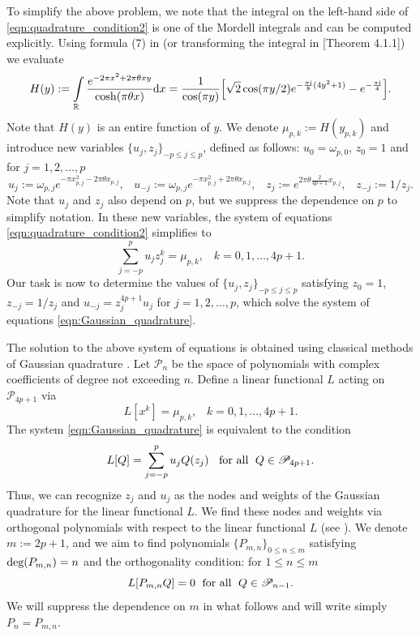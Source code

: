 \documentclass[12pt]{article}
\def\r{{\mathbb R}}
\def\d{{\textnormal d}}
\def\i{{\textnormal i}}
\theoremstyle{definition}
\begin{document}
To simplify the above problem, we note that the integral on the left-hand side of \eqref{eqn:quadrature_condition2} is one of the Mordell integrals \cite{Mordell2} and can be computed explicitly. Using formula (7) in \cite{Kuznetsov2007} (or transforming the integral in \cite{Gabcke1979}[Theorem 4.1.1]) 
we evaluate 
\begin{equation}\label{eqn:Mordell_integral}
H(y):=\int\limits_{\r} \frac{e^{-2\pi x^2+ 2 \pi  \theta  x y }}{\cosh(\pi \theta x)}   \d x=
\frac{1}{\cos(\pi y)} \Big[\sqrt{2} \cos(\pi y/2) e^{-\frac{\pi \i}{8}
(4y^2+1)} -e^{-\frac{\pi \i}{4}}\Big].
\end{equation}
Note that $H(y)$ is an entire function of $y$. 
We denote $\mu_{p,k}:=H(y_{p,k})$ 
and introduce new variables $\{u_j,z_j\}_{-p \le j \le p}$, defined as follows: $u_0=\omega_{p,0}$, $z_0=1$ and for $j=1,2,\dots,p$
\begin{equation*}
u_j:=\omega_{p,j} e^{-\pi x_{p,j}^2 - 2\pi \theta x_{p,j}}, \;\;\;
u_{-j}:=\omega_{p,j} e^{-\pi x_{p,j}^2 + 2\pi \theta x_{p,j}}, \;\;\;
z_j:=e^{2\pi \theta \frac{2}{4p+1} x_{p,j}}, \;\;\; 
z_{-j}:=1/z_j. 
\end{equation*}
Note that $u_j$ and $z_j$ also depend on $p$, but we suppress the dependence on $p$ to simplify  notation. 
In these new variables, the system of equations \eqref{eqn:quadrature_condition2} simplifies to 
\begin{equation}\label{eqn:Gaussian_quadrature}
\sum\limits_{j=-p}^p u_j z_j^k = \mu_{p,k}, \;\;\; k=0,1,\dots,4p+1. 
\end{equation}
Our task is now to determine the values of $\{u_j,z_j\}_{-p \le j \le p}$ satisfying $z_0=1$, $z_{-j}=1/z_j$ and $u_{-j}=z_j^{4p+1} u_j$ for $j=1,2,\dots,p$, which solve the system of equations \eqref{eqn:Gaussian_quadrature}.  





The solution to the above system of equations is obtained using classical methods of Gaussian quadrature \cite{GONZALEZV1995,Laurie_2001,MILOVANOVIC2005,Pozza2016}. Let ${\mathscr P}_n$ be the space of polynomials with complex coefficients of degree not exceeding $n$. Define a linear functional $L$ acting on ${\mathscr P}_{4p+1}$ via
$$
L[x^k]=\mu_{p,k}, \;\;\; k=0,1,\dots,4p+1. 
$$
The system \eqref{eqn:Gaussian_quadrature} is equivalent to the condition
\begin{equation}\label{eqn:Gaussian_quadrature3}
L[Q]=\sum\limits_{j=-p}^p u_j Q(z_j) \;\;
{\textnormal{ for all }} \; Q \in {\mathscr P}_{4p+1}. 
\end{equation}
Thus, we can recognize $z_j$ and $u_j$ as the nodes and weights of the Gaussian quadrature for the linear functional $L$. 
We find these nodes and weights via orthogonal polynomials with respect to the linear functional $L$ (see \cite[Definition 1.1]{Pozza2016}). We denote $m:=2p+1$, and we aim to find polynomials $\{P_{m,n}\}_{0\le n \le m}$ satisfying ${\textnormal{deg}} ( P_{m,n})=n$ and the orthogonality condition: for $1 \le n \le m$  
$$
L[P_{m,n} Q]=0 \; {\textnormal{ for all }} \; Q\in {\mathscr P}_{n-1}. 
$$
We will suppress the dependence on $m$ in what follows and will write simply $P_n=P_{m,n}$.
\end{document}

